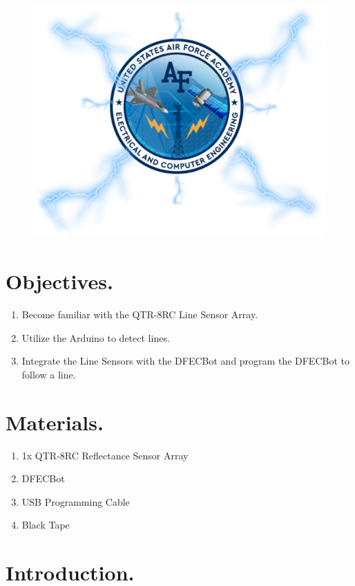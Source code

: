 \documentclass{handout}
\begin{document}
	\maketitle
		\begin{figure}[H]
		\centering
		\includegraphics[width=.75\textwidth]{Cover.PNG}
	\end{figure}
	
	\section{Objectives.} 
	\begin{enumerate}
		\item Become familiar with the QTR-8RC Line Sensor Array.
		\item Utilize the Arduino to detect lines.
		\item Integrate the Line Sensors with the DFECBot and program the DFECBot to follow a line.
	\end{enumerate}
	
	\section{Materials.}
	\begin{enumerate}
		\item 1x QTR-8RC Reflectance Sensor Array
		\item DFECBot
		\item USB Programming Cable
		\item Black Tape
	\end{enumerate}
	
	\section{Introduction.}
	
\end{document}
